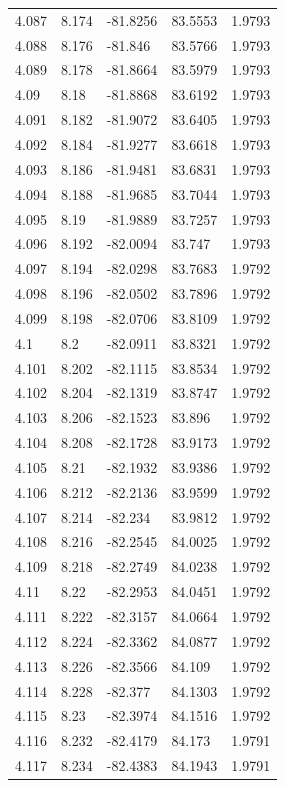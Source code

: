 \begin{tabular}{lllll}
4.087 & 8.174 & -81.8256 & 83.5553 & 1.9793 \\
4.088 & 8.176 & -81.846 & 83.5766 & 1.9793 \\
4.089 & 8.178 & -81.8664 & 83.5979 & 1.9793 \\
4.09 & 8.18 & -81.8868 & 83.6192 & 1.9793 \\
4.091 & 8.182 & -81.9072 & 83.6405 & 1.9793 \\
4.092 & 8.184 & -81.9277 & 83.6618 & 1.9793 \\
4.093 & 8.186 & -81.9481 & 83.6831 & 1.9793 \\
4.094 & 8.188 & -81.9685 & 83.7044 & 1.9793 \\
4.095 & 8.19 & -81.9889 & 83.7257 & 1.9793 \\
4.096 & 8.192 & -82.0094 & 83.747 & 1.9793 \\
4.097 & 8.194 & -82.0298 & 83.7683 & 1.9792 \\
4.098 & 8.196 & -82.0502 & 83.7896 & 1.9792 \\
4.099 & 8.198 & -82.0706 & 83.8109 & 1.9792 \\
4.1 & 8.2 & -82.0911 & 83.8321 & 1.9792 \\
4.101 & 8.202 & -82.1115 & 83.8534 & 1.9792 \\
4.102 & 8.204 & -82.1319 & 83.8747 & 1.9792 \\
4.103 & 8.206 & -82.1523 & 83.896 & 1.9792 \\
4.104 & 8.208 & -82.1728 & 83.9173 & 1.9792 \\
4.105 & 8.21 & -82.1932 & 83.9386 & 1.9792 \\
4.106 & 8.212 & -82.2136 & 83.9599 & 1.9792 \\
4.107 & 8.214 & -82.234 & 83.9812 & 1.9792 \\
4.108 & 8.216 & -82.2545 & 84.0025 & 1.9792 \\
4.109 & 8.218 & -82.2749 & 84.0238 & 1.9792 \\
4.11 & 8.22 & -82.2953 & 84.0451 & 1.9792 \\
4.111 & 8.222 & -82.3157 & 84.0664 & 1.9792 \\
4.112 & 8.224 & -82.3362 & 84.0877 & 1.9792 \\
4.113 & 8.226 & -82.3566 & 84.109 & 1.9792 \\
4.114 & 8.228 & -82.377 & 84.1303 & 1.9792 \\
4.115 & 8.23 & -82.3974 & 84.1516 & 1.9792 \\
4.116 & 8.232 & -82.4179 & 84.173 & 1.9791 \\
4.117 & 8.234 & -82.4383 & 84.1943 & 1.9791 \\

\end{tabular}
